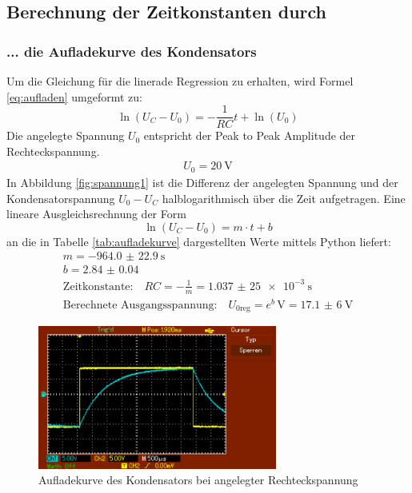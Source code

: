 
\subsection{Berechnung der Zeitkonstanten durch}
\subsubsection{... die Aufladekurve des Kondensators}
Um die Gleichung für die linerade Regression zu erhalten, wird Formel \eqref{eq:aufladen} umgeformt zu:
\begin{equation}
\ln(U_C - U_0) = -\frac{1}{RC} t + \ln(U_0)
\end{equation}
Die angelegte Spannung $U_0$ entspricht der Peak to Peak Amplitude der Rechteckspannung.
\begin{align*}
	U_0 = \SI{20}{\volt}
\end{align*}
In Abbildung \ref{fig:spannung1} ist die Differenz der angelegten Spannung und der Kondensatorspannung $U_0 - U_C$ halblogarithmisch über die Zeit aufgetragen. Eine lineare Ausgleichsrechnung der Form
\begin{equation}
\ln(U_C - U_0) = m \cdot t + b
\end{equation} an die in Tabelle \ref{tab:aufladekurve} dargestellten Werte mittels Python liefert:
\begin{align}
	m = \SI{-964.0(229)}{\second} \\
	b = \num{2.84(4)} \\
	\text{Zeitkonstante:} \quad RC = - \frac{1}{m} = \SI{1,037(25)e-3}{\second} \\
	\text{Berechnete Ausgangsspannung:} \quad U_{0\text{reg}} = e ^b \, \si{\volt} = \SI{17,1(6)}{\volt}
\end{align}
	
	
	
	
	

\begin{figure}[h!]
	\centering
	\includegraphics[width=0.7\textwidth]{aufladekurve.png}
	\caption{Aufladekurve des Kondensators bei angelegter Rechteckspannung}
	\label{fig:aufladekurve}
\end{figure} 

